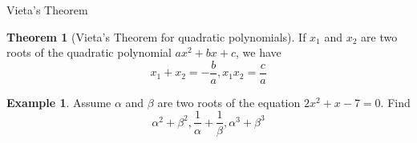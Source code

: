 \documentclass{beamer}
\theoremstyle{definition}
\newtheorem{theo}[defn]{Theorem}
\newtheorem{exam}[defn]{Example}
\begin{document}
\begin{frame}{Vieta's Theorem}
    \begin{theo}[Vieta's Theorem for quadratic polynomials]
        If $x_1$ and $x_2$ are two roots of the quadratic polynomial $ax^2+bx+c$, we have
        \begin{equation*}
            x_1+x_2=-\frac{b}{a}, x_1x_2=\frac{c}{a}
        \end{equation*}
    \end{theo}
    \begin{exam}
        Assume $\alpha$ and $\beta$ are two roots of the equation $2x^2+x-7=0$. Find
        \begin{equation*}
            \alpha^2+\beta^2, \frac{1}{\alpha}+\frac{1}{\beta}, \alpha^3+\beta^3
        \end{equation*}
    \end{exam}
\end{frame}
\end{document}
